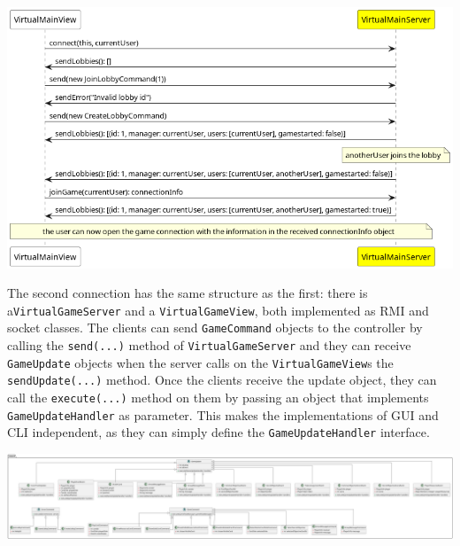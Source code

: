 \documentclass{article}
\begin{document}
\begin{center}
    \includegraphics[scale=0.35]{pngs/sequence_game_creation}
\end{center}
The second connection has the same structure as the first: there is a\texttt{VirtualGameServer} and a \texttt{VirtualGameView}, both implemented as RMI and socket classes.
The clients can send \texttt{GameCommand} objects to the controller by calling the \texttt{send(...)} method of \texttt{VirtualGameServer}
and they can receive \texttt{GameUpdate} objects when the server calls on the \texttt{VirtualGameView}s the \texttt{sendUpdate(...)} method.
Once the clients receive the update object, they can call the \texttt{execute(...)} method on them by passing an object that implements \texttt{GameUpdateHandler} as parameter.
This makes the implementations of GUI and CLI independent, as they can simply define the \texttt{GameUpdateHandler} interface.
\begin{center}
    \includegraphics[scale=0.2]{pngs/network}
\end{center}

\newpage
\end{document}
